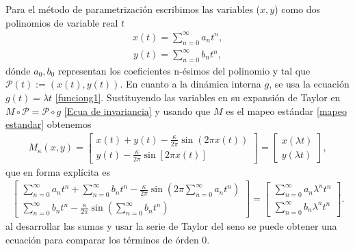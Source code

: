 Para el m\'etodo de parametrizaci\'on escribimos las variables ($x,y$) como dos polinomios de variable real $t$
\begin{eqnarray}
x(t)=\sum_{n=0}^{\infty}a_{n}t^{n}  ,
\label{x}
\end{eqnarray}
\begin{eqnarray}
y(t)=\sum_{n=0}^{\infty}b_{n}t^{n},
\label{y}
\end{eqnarray}
d\'onde $a_{0},b_{0}$ representan los coeficientes n-\'esimos del polinomio y tal que $\mathcal{P}(t):=(x(t),y(t))$. En cuanto a la dinámica interna $g$, se usa la ecuación $g(t)=\lambda t$ \eqref{funciong1}. Sustituyendo las variables en su expansi\'on de Taylor en $M\circ\mathcal{P}=\mathcal{P}\circ g$ \eqref{Ecua de invariancia}  y usando que $M$ es el mapeo est\'andar \eqref{mapeo estandar} obtenemos
\begin{eqnarray}
M_{\kappa}(x,y) = \left[\begin{array}{c}
x(t) + y(t) -\frac{\kappa}{2\pi}\sin(2\pi x(t)) \\
y(t) - \frac{\kappa}{2\pi}\sin[2\pi x(t)]
\end{array}\right] =\left[ \begin{array}{c}
x(\lambda t) \\
y(\lambda t)
\end{array}\right], 
\label{sumas en mapeo}
\end{eqnarray}
que en forma explícita es
\begin{eqnarray}
\left[\begin{array}{c}
\sum_{n=0}^{\infty}a_{n}t^{n} + \sum_{n=0}^{\infty}b_{n}t^{n} -\frac{\kappa}{2\pi}\sin\left(2\pi \sum_{n=0}^{\infty}a_{n}t^{n}\right)\\
\sum_{n=0}^{\infty}b_{n}t^{n} - \frac{\kappa}{2\pi}\sin(\sum_{n=0}^{\infty}b_{n}t^{n})
\end{array}\right] =\left[ \begin{array}{c}
\sum_{n=0}^{\infty}a_{n}\lambda^{n}t^{n} \\
\sum_{n=0}^{\infty}b_{n}\lambda^{n}t^{n}
\end{array}\right].
\label{expandida}
\end{eqnarray}
al desarrollar las sumas y usar la serie de Taylor del seno se puede obtener una ecuaci\'on para comparar los t\'erminos de \'orden 0. 

